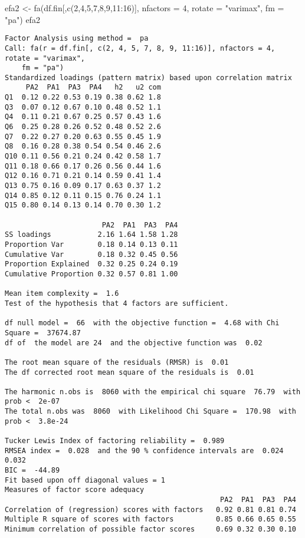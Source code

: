 \documentclass[
  letterpaper,
  DIV=11,
  numbers=noendperiod]{scrartcl}
\newenvironment{Shaded}{\begin{snugshade}}{\end{snugshade}}
\newcommand{\AttributeTok}[1]{\textcolor[rgb]{0.40,0.45,0.13}{#1}}
\newcommand{\DecValTok}[1]{\textcolor[rgb]{0.68,0.00,0.00}{#1}}
\newcommand{\FunctionTok}[1]{\textcolor[rgb]{0.28,0.35,0.67}{#1}}
\newcommand{\NormalTok}[1]{\textcolor[rgb]{0.00,0.23,0.31}{#1}}
\newcommand{\OtherTok}[1]{\textcolor[rgb]{0.00,0.23,0.31}{#1}}
\newcommand{\SpecialCharTok}[1]{\textcolor[rgb]{0.37,0.37,0.37}{#1}}
\newcommand{\StringTok}[1]{\textcolor[rgb]{0.13,0.47,0.30}{#1}}
\begin{document}
\begin{Shaded}
\begin{Highlighting}[]
\NormalTok{efa2 }\OtherTok{\textless{}{-}} \FunctionTok{fa}\NormalTok{(df.fin[,}\FunctionTok{c}\NormalTok{(}\DecValTok{2}\NormalTok{,}\DecValTok{4}\NormalTok{,}\DecValTok{5}\NormalTok{,}\DecValTok{7}\NormalTok{,}\DecValTok{8}\NormalTok{,}\DecValTok{9}\NormalTok{,}\DecValTok{11}\SpecialCharTok{:}\DecValTok{16}\NormalTok{)], }\AttributeTok{nfactors =} \DecValTok{4}\NormalTok{, }\AttributeTok{rotate =} \StringTok{"varimax"}\NormalTok{, }\AttributeTok{fm =} \StringTok{"pa"}\NormalTok{)}
\NormalTok{efa2}
\end{Highlighting}
\end{Shaded}

\begin{verbatim}
Factor Analysis using method =  pa
Call: fa(r = df.fin[, c(2, 4, 5, 7, 8, 9, 11:16)], nfactors = 4, rotate = "varimax", 
    fm = "pa")
Standardized loadings (pattern matrix) based upon correlation matrix
     PA2  PA1  PA3  PA4   h2   u2 com
Q1  0.12 0.22 0.53 0.19 0.38 0.62 1.8
Q3  0.07 0.12 0.67 0.10 0.48 0.52 1.1
Q4  0.11 0.21 0.67 0.25 0.57 0.43 1.6
Q6  0.25 0.28 0.26 0.52 0.48 0.52 2.6
Q7  0.22 0.27 0.20 0.63 0.55 0.45 1.9
Q8  0.16 0.28 0.38 0.54 0.54 0.46 2.6
Q10 0.11 0.56 0.21 0.24 0.42 0.58 1.7
Q11 0.18 0.66 0.17 0.26 0.56 0.44 1.6
Q12 0.16 0.71 0.21 0.14 0.59 0.41 1.4
Q13 0.75 0.16 0.09 0.17 0.63 0.37 1.2
Q14 0.85 0.12 0.11 0.15 0.76 0.24 1.1
Q15 0.80 0.14 0.13 0.14 0.70 0.30 1.2

                       PA2  PA1  PA3  PA4
SS loadings           2.16 1.64 1.58 1.28
Proportion Var        0.18 0.14 0.13 0.11
Cumulative Var        0.18 0.32 0.45 0.56
Proportion Explained  0.32 0.25 0.24 0.19
Cumulative Proportion 0.32 0.57 0.81 1.00

Mean item complexity =  1.6
Test of the hypothesis that 4 factors are sufficient.

df null model =  66  with the objective function =  4.68 with Chi Square =  37674.87
df of  the model are 24  and the objective function was  0.02 

The root mean square of the residuals (RMSR) is  0.01 
The df corrected root mean square of the residuals is  0.01 

The harmonic n.obs is  8060 with the empirical chi square  76.79  with prob <  2e-07 
The total n.obs was  8060  with Likelihood Chi Square =  170.98  with prob <  3.8e-24 

Tucker Lewis Index of factoring reliability =  0.989
RMSEA index =  0.028  and the 90 % confidence intervals are  0.024 0.032
BIC =  -44.89
Fit based upon off diagonal values = 1
Measures of factor score adequacy             
                                                   PA2  PA1  PA3  PA4
Correlation of (regression) scores with factors   0.92 0.81 0.81 0.74
Multiple R square of scores with factors          0.85 0.66 0.65 0.55
Minimum correlation of possible factor scores     0.69 0.32 0.30 0.10
\end{verbatim}
\end{document}
